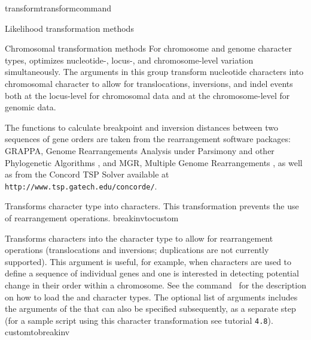 \begin{command}{transform}{transformcommand}
\begin{arguments}
\begin{argumentgroup}{Likelihood transformation methods}
        \end{argumentgroup}


        \begin{argumentgroup}{Chromosomal transformation methods}
           For chromosome and genome character types, \poy optimizes nucleotide-, 
           locus-, and chromosome-level variation simultaneously. The arguments in this group
           transform nucleotide characters into chromosomal character
           to allow for translocations, inversions, and indel events both at the locus-level for chromosomal data
           and at the chromosome-level for genomic data.
           
         The functions to calculate breakpoint and inversion distances between two
	sequences of gene orders are taken from the rearrangement software packages: GRAPPA, Genome
	Rearrangements Analysis under Parsimony and other Phylogenetic Algorithms \cite{baderetal2002}, 
	and MGR, Multiple Genome Rearrangements \cite{bourqueandpevzner2002}, as well as from the 	 
	Concord TSP Solver available at \texttt{http://www.tsp.gatech.edu/concorde/}.
	
            {Transforms  character type into  	 
            characters. This transformation prevents the use of rearrangement operations.} 
            {breakinvtocustom}

            {Transforms  characters into the  character type to allow for 
            rearrangement operations (translocations and inversions; duplications are not currently supported). This argument is useful, for 
            example, when  characters are used to define a sequence of individual genes and one is 
            interested in detecting potential change in their order within a chromosome. 
            See the command~ for the description on how to load the  and  character types. The optional list of arguments
            includes the arguments of the  that can also
            be specified subsequently, as a separate step (for a sample script using this character 	transformation see tutorial \texttt{4.8}).}
            {customtobreakinv}
             

\end{argumentgroup}
\end{arguments}
\end{command}
